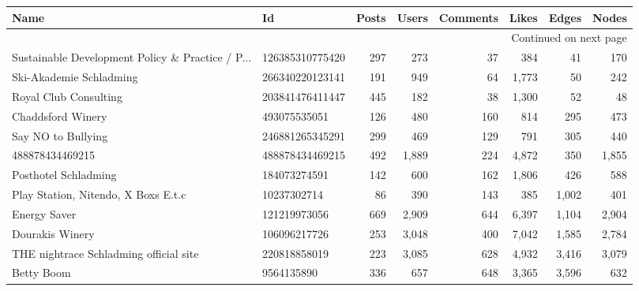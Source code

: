 \begin{longtable}{llrrrrrr}
\toprule
                                              Name &               Id &   Posts &       Users &   Comments &       Likes &       Edges &     Nodes \\
\midrule
\endhead
\midrule
\multicolumn{8}{r}{{Continued on next page}} \\
\midrule
\endfoot

\bottomrule
\endlastfoot
 Sustainable Development Policy \& Practice / P... &  126385310775420 &     297 &         273 &         37 &         384 &          41 &       170 \\
                           Ski-Akademie Schladming &  266340220123141 &     191 &         949 &         64 &       1,773 &          50 &       242 \\
                             Royal Club Consulting &  203841476411447 &     445 &         182 &         38 &       1,300 &          52 &        48 \\
                                 Chaddsford Winery &     493075535051 &     126 &         480 &        160 &         814 &         295 &       473 \\
                                Say NO to Bullying &  246881265345291 &     299 &         469 &        129 &         791 &         305 &       440 \\
                                   488878434469215 &  488878434469215 &     492 &       1,889 &        224 &       4,872 &         350 &     1,855 \\
                              Posthotel Schladming &     184073274591 &     142 &         600 &        162 &       1,806 &         426 &       588 \\
              Play Station, Nitendo, X Boxs  E.t.c &      10237302714 &      86 &         390 &        143 &         385 &       1,002 &       401 \\
                                      Energy Saver &     121219973056 &     669 &       2,909 &        644 &       6,397 &       1,104 &     2,904 \\
                                   Dourakis Winery &     106096217726 &     253 &       3,048 &        400 &       7,042 &       1,585 &     2,784 \\
            THE nightrace Schladming official site &     220818858019 &     223 &       3,085 &        628 &       4,932 &       3,416 &     3,079 \\
                                        Betty Boom &       9564135890 &     336 &         657 &        648 &       3,365 &       3,596 &       632 \\

\end{longtable}
